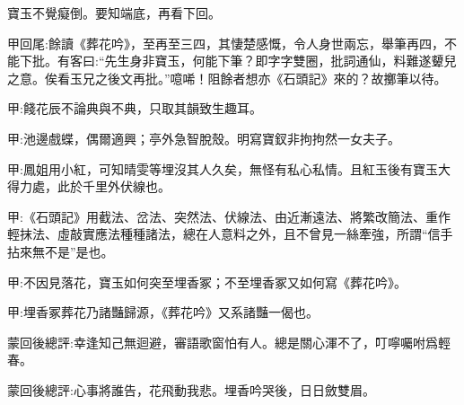 \begin{parag}
    寶玉不覺癡倒。要知端底，再看下回。
\end{parag}


\begin{parag}
    \begin{note}甲回尾:餘讀《葬花吟》，至再至三四，其悽楚感慨，令人身世兩忘，舉筆再四，不能下批。有客曰:“先生身非寶玉，何能下筆？即字字雙圈，批詞通仙，料難遂顰兒之意。俟看玉兄之後文再批。”噫唏！阻餘者想亦《石頭記》來的？故擲筆以待。\end{note}
\end{parag}


\begin{parag}
    \begin{note}甲:餞花辰不論典與不典，只取其韻致生趣耳。\end{note}
\end{parag}


\begin{parag}
    \begin{note}甲:池邊戲蝶，偶爾適興；亭外急智脫殼。明寫寶釵非拘拘然一女夫子。\end{note}
\end{parag}


\begin{parag}
    \begin{note}甲:鳳姐用小紅，可知晴雯等埋沒其人久矣，無怪有私心私情。且紅玉後有寶玉大得力處，此於千里外伏線也。\end{note}
\end{parag}


\begin{parag}
    \begin{note}甲:《石頭記》用截法、岔法、突然法、伏線法、由近漸遠法、將繁改簡法、重作輕抹法、虛敲實應法種種諸法，總在人意料之外，且不曾見一絲牽強，所謂“信手拈來無不是”是也。\end{note}
\end{parag}


\begin{parag}
    \begin{note}甲:不因見落花，寶玉如何突至埋香冢；不至埋香冢又如何寫《葬花吟》。\end{note}
\end{parag}


\begin{parag}
    \begin{note}甲:埋香冢葬花乃諸豔歸源，《葬花吟》又系諸豔一偈也。\end{note}
\end{parag}


\begin{parag}
    \begin{note}蒙回後總評:幸逢知己無迴避，審語歌窗怕有人。總是關心渾不了，叮嚀囑咐爲輕春。\end{note}
\end{parag}


\begin{parag}
    \begin{note}蒙回後總評:心事將誰告，花飛動我悲。埋香吟哭後，日日斂雙眉。\end{note}
\end{parag}

